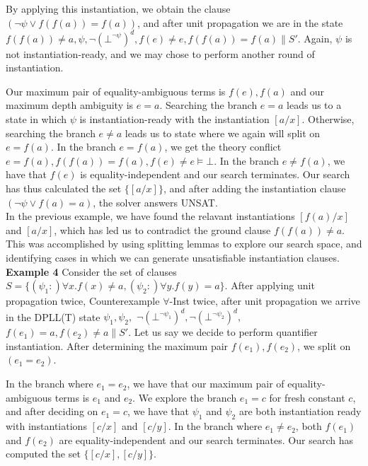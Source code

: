 \documentclass{llncs}
\begin{document}
By applying this instantiation, we obtain the clause $( \neg \psi \vee f( f( a ) ) = f( a ) )$, and after unit propagation we are in the state $f( f( a ) ) \neq a, \psi, \neg (\bot^{\neg \psi})^d, f(e) \neq e, f( f( a ) ) = f( a ) \parallel S'$.
Again, $\psi$ is not instantiation-ready, and we may chose to perform another round of instantiation.

Our maximum pair of equality-ambiguous terms is $f( e ), f( a )$ and our maximum depth ambiguity is $e = a$.
Searching the branch $e = a$ leads us to a state in which $\psi$ is instantiation-ready with the instantiation $[a/x]$.
Otherwise, searching the branch $e \neq a$ leads us to state where we again will split on $e = f( a )$.
In the branch $e = f( a )$, we get the theory conflict $e = f( a ), f( f( a ) ) = f( a ), f( e ) \neq e \models \bot$.
In the branch $e \neq f( a )$, we have that $f( e )$ is equality-independent and our search terminates.
Our search has thus calculated the set $\{ [a/x] \}$, and after adding the instantiation clause $( \neg \psi \vee f( a ) = a )$, the solver answers UNSAT. \\

In the previous example, we have found the relavant instantiations $[f(a)/x]$ and $[a/x]$, which has led us to contradict the ground clause $f( f( a ) ) \neq a$.
This was accomplished by using splitting lemmas to explore our search space, and identifying cases in which we can generate unsatisfiable instantiation clauses. \\

{\bf Example 4}
Consider the set of clauses $S = \{ (\psi_1 :)\forall x. f(x) \neq a, (\psi_2 :)\forall y. f(y) = a \}$.
After applying unit propagation twice, Counterexample $\forall$-Inst twice, after unit propagation we arrive in the DPLL(T) state $\psi_1, \psi_2,$ $\neg (\bot^{\neg \psi_1})^d, \neg (\bot^{\neg \psi_2})^d,$ $f(e_1) = a, f(e_2) \neq a \parallel S'$.
Let us say we decide to perform quantifier instantiation.
After determining the maximum pair $f(e_1),f(e_2)$, we split on $( e_1 = e_2 )$.

In the branch where $e_1 = e_2$, we have that our maximum pair of equality-ambiguous terms is $e_1$ and $e_2$.
We explore the branch $e_1 = c$ for fresh constant $c$, and after deciding on $e_1 = c$, we have that $\psi_1$ and $\psi_2$ are both instantiation ready with instantiations $[c/x]$ and $[c/y]$.
In the branch where $e_1 \neq e_2$, both $f( e_1 )$ and $f( e_2 )$ are equality-independent and our search terminates.
Our search has computed the set $\{ [c/x], [c/y] \}$.
\end{document}
